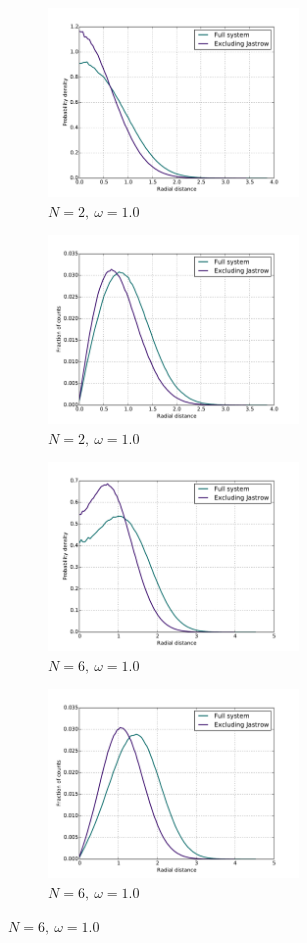 \documentclass[english, a4paper]{article}
\begin{document}
\begin{figure}[H]
	
	\begin{subfigure}{0.5\textwidth}
		\includegraphics[width=\textwidth, height= 5cm]{figures/radialDistribution/OneBodyDensityN2w100Se7.pdf}
		\caption{$N=2,\:\omega=1.0$}
	\end{subfigure}
	\begin{subfigure}{0.5\textwidth}
		\includegraphics[width=\textwidth, height= 5cm]{figures/radialDistribution/radialDistributionN2w100Se7.pdf}
		\caption{$N=2,\:\omega=1.0$}
	\end{subfigure}
	
	\vspace{1mm}
	
	\begin{subfigure}{0.5\textwidth}
		\includegraphics[width=\textwidth, height= 5cm]{figures/radialDistribution/OneBodyDensityN6w100Se7.pdf}
		\caption{$N=6,\:\omega=1.0$}
	\end{subfigure}
	\begin{subfigure}{0.5\textwidth}
		\includegraphics[width=\textwidth, height= 5cm]{figures/radialDistribution/radialDistributionN6w100Se7.pdf}
		\caption{$N=6,\:\omega=1.0$}
	\end{subfigure}
	

\end{figure}
\end{document}
